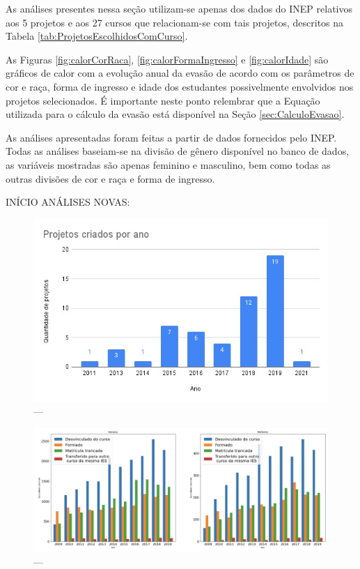 As análises presentes nessa seção utilizam-se apenas dos dados do INEP relativos aos 5 projetos e aos 27 cursos que relacionam-se com tais projetos, descritos na Tabela \ref{tab:ProjetosEscolhidosComCurso}.

As Figuras \ref{fig:calorCorRaca}, \ref{fig:calorFormaIngresso} e \ref{fig:calorIdade} são gráficos de calor com a evolução anual da evasão de acordo com os parâmetros de cor e raça, forma de ingresso e idade dos estudantes possivelmente envolvidos nos projetos selecionados.
É importante neste ponto relembrar que a Equação utilizada para o cálculo da evasão está disponível na Seção \ref{sec:CalculoEvasao}.


As análises apresentadas foram feitas a partir de dados fornecidos pelo INEP. Todas as análises baseiam-se na divisão de gênero disponível no banco de dados, as variáveis mostradas são apenas feminino e masculino, bem como todas as outras divisões de cor e raça e forma de ingresso.

INÍCIO ANÁLISES NOVAS:

\begin{figure}[H]
\centering
\includegraphics[width=1\textwidth]{Figuras/ProjetosPorAno.jpeg}
\caption{---}
\label{fig:ProjetosPorAno}
\end{figure}
 
\begin{figure}[H]
\centering
\includegraphics[width=1\textwidth]{Figuras/situacaodosalunos.jpeg}
\caption{---}
\label{fig:situacaodosalunos}
\end{figure}

